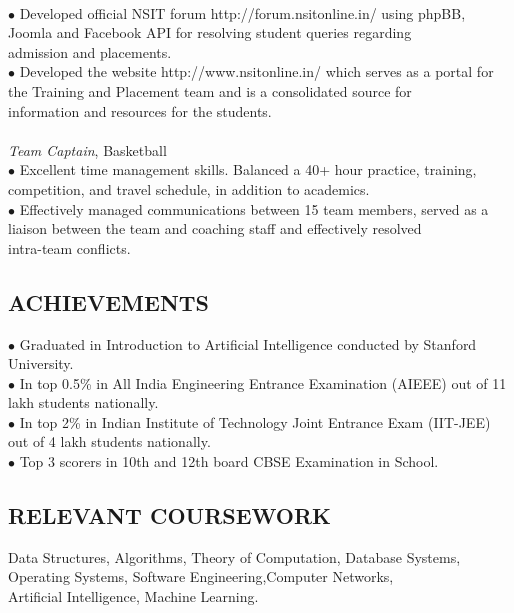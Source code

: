 \documentclass[10.5pt]{article}
\begin{document}
\\
$\bullet$ Developed official NSIT forum http://forum.nsitonline.in/ using phpBB, Joomla and Facebook API for resolving student queries regarding
 \\\hspace*{2.5mm}  admission and placements.
\\
$\bullet$ Developed the website http://www.nsitonline.in/ which serves as a portal for the Training and Placement team and is a consolidated source for 
 \\\hspace*{2.5mm} information and resources for the students. 
\\
\\
{\emph{Team Captain}}, Basketball
\\
$\bullet$ Excellent time management skills. Balanced a 40+ hour practice, training, competition, and travel schedule, in addition to academics.
\\
$\bullet$ Effectively managed communications between 15 team members, served as a liaison between the team and coaching staff and effectively resolved 
\\\hspace*{2.5mm} intra-team conflicts.



\subsection*{ACHIEVEMENTS}
\vspace{-3pt}
$\bullet$ Graduated in Introduction to Artificial Intelligence conducted by Stanford University. 
\\
$\bullet$ In top 0.5\% in All India Engineering Entrance Examination (AIEEE) out of 11 lakh students nationally.
\\
$\bullet$ In top 2\% in Indian Institute of Technology Joint Entrance Exam (IIT-JEE) out of 4 lakh students nationally.
\\
$\bullet$ Top 3 scorers in 10th and 12th board CBSE Examination in School.


\subsection*{RELEVANT COURSEWORK}
\vspace{-3pt}
{Data Structures, Algorithms, Theory of Computation, Database Systems, Operating Systems, Software Engineering,Computer Networks,
\\  Artificial Intelligence, Machine Learning.}
\end{document}
